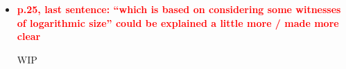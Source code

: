 \documentclass[a4paper]{article}
\newcommand{\red}[1]{{\bf\textcolor{red}{#1}}}
\begin{document}
\begin{itemize}
	\item \red{p.25, last sentence: ``which is based on considering some witnesses of logarithmic size'' could be explained a little more / made more clear}
	
	WIP
	

\end{itemize}
\end{document}

